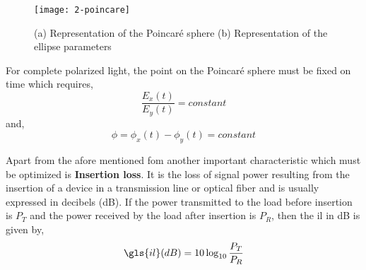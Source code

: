 \documentclass[../report.tex]{subfiles}
\begin{document}
\begin{figure}[H]
	\centering
	\texttt{[image: 2-poincare]}
	\caption{(a) Representation of the Poincaré sphere (b) Representation of the ellipse parameters \cite{flossmann_stokes_2006}}
	\label{fig:2_poincare}
\end{figure}
\noindent For complete polarized light, the point on the Poincaré sphere must be fixed on time which requires,
\begin{equation}\label{eq:polarization_condition_1}
\dfrac {E_{x}\left( t\right) } {E_{y}\left( t\right) }=constant
\end{equation}
and,
\begin{equation}\label{eq:polarization_condition_2}
\phi = \phi_{x}(t) - \phi_{y}(t)=constant
\end{equation}
\par Apart from the afore mentioned \gls{fom} another important characteristic which must be optimized is \textbf{Insertion loss}. It is the loss of signal power resulting from the insertion of a device in a transmission line or optical fiber and is usually expressed in decibels (dB). If the power transmitted to the load before insertion is $P_T$ and the power received by the load after insertion is $P_R$, then the \gls{il} in dB is given by,
\begin{equation}\label{eq:insertion_loss}
\gls{il} (dB) = 10\log _{10} \dfrac {P_{T}} {P_{R}}
\end{equation}
  
\end{document}
